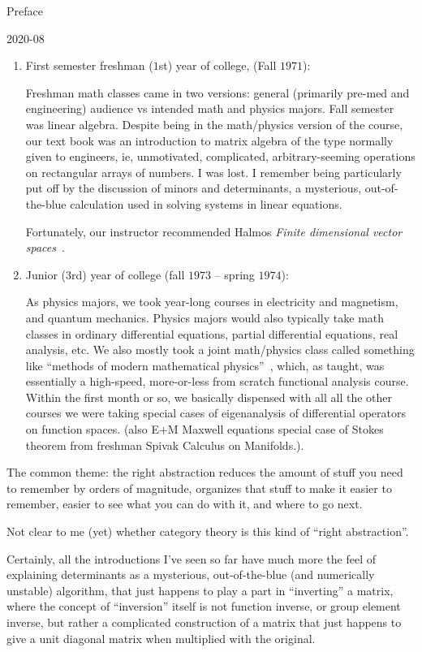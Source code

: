 \begin{plSection}{Preface}
\begin{plSection}{2020-08}
\begin{enumerate}
  \item First semester freshman ($1$st) year of college,
  (Fall $1971$):
  \par
  Freshman math classes came in two versions: 
  general (primarily pre-med and engineering) audience
  vs intended math and physics majors. Fall semester was linear 
  algebra. Despite being in the math/physics version of the course,
  our text book was an introduction to matrix algebra of the type
  normally given to engineers, ie, unmotivated, complicated,
  arbitrary-seeming operations on rectangular arrays of numbers.
  I was lost. I remember being particularly put off by the 
  discussion of minors and determinants, a mysterious, 
  out-of-the-blue calculation used in solving systems in linear
  equations.
  \par
  Fortunately, our instructor recommended 
  Halmos \emph{Finite dimensional vector 
  spaces}~\cite{Halmos:1958:Finite}. 
  
  \item Junior ($3$rd) year of college 
  (fall $1973$ -- spring $1974$):
  \par
  As physics majors, we took year-long courses in 
  electricity and magnetism, and quantum mechanics.
  Physics majors would also typically take math classes in
  ordinary differential equations, partial differential equations,
  real analysis, etc. We also mostly took a joint math/physics
  class called something like ``methods of modern mathematical 
  physics''~\cite{Reed:Simon:1972:FunctionalAnalysis}, 
  which, as taught, was essentially a high-speed,
  more-or-less from scratch functional analysis course.
  Within the first month or so, we basically dispensed with all
  all the other courses we were taking special cases of 
  eigenanalysis of differential operators on function spaces.
  (also E+M Maxwell equations special case of Stokes theorem 
  from freshman Spivak Calculus on Manifolds.).
  
\end{enumerate}

The common theme: the right abstraction reduces 
the amount of stuff you need to remember by orders of magnitude,
organizes that stuff to make it easier to remember,
easier to see what you can do with it,
and where to go next.

Not clear to me (yet) whether category theory is this kind of
``right abstraction''. 

Certainly, all the introductions I've seen so far have much more
the feel of explaining determinants as a mysterious,
out-of-the-blue (and numerically unstable) algorithm,
that just happens to play a part in ``inverting'' a matrix,
where the concept of ``inversion'' itself is not 
function inverse, or group element inverse,
but rather a complicated construction of a matrix that
just happens to give a unit diagonal matrix when multiplied with 
the original.

\end{plSection}%
\end{plSection}%
